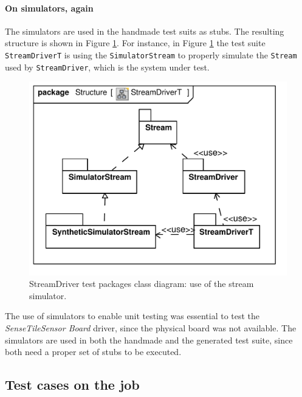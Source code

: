 \documentclass[english]{lni}
\newcommand{\lil}[1]{\texttt{\lstinline|#1|}}
\newcommand{\ST}{\emph{SenseTile}\xspace}
\newcommand{\SB}{\emph{Sensor Board}\xspace}
\newcommand{\STSB}{\ST \SB\xspace}
\begin{document}
\paragraph*{On simulators, again}

The simulators are used in the handmade test suits as stubs.
The resulting structure is shown in Figure \ref{fig:class_diagram_streamdriver_test}.  
For instance, in Figure \ref{fig:class_diagram_streamdriver_test} the test suite \lil{StreamDriverT} is using the \lil{SimulatorStream} to properly simulate the \lil{Stream} used by \lil{StreamDriver}, which is the system under test.

\begin{figure}[htb!]
  \centering
  \includegraphics[scale=0.4]{UML_model/Class_Diagram__Structure__StreamDriverT}
  \caption{StreamDriver test packages class diagram: use of the stream
    simulator.}
  \label{fig:class_diagram_streamdriver_test}
\end{figure}

The use of simulators to enable unit testing was essential to test the \STSB driver, since the physical board was not available.
The simulators are used in both the handmade and the generated test suite, since both need a proper set of stubs to be executed.



\subsection{Test cases on the job}
\label{subsec:test_cases_on_the_job}
\end{document}
